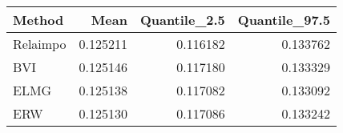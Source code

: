 \begin{table}[ht]
\centering
\begin{tabular}{lrrr}
  \hline
Method & Mean & Quantile\_2.5 & Quantile\_97.5 \\ 
  \hline
Relaimpo & 0.125211 & 0.116182 & 0.133762 \\ 
  BVI & 0.125146 & 0.117180 & 0.133329 \\ 
  ELMG & 0.125138 & 0.117082 & 0.133092 \\ 
  ERW & 0.125130 & 0.117086 & 0.133242 \\ 
   \hline
\end{tabular}
\end{table}
